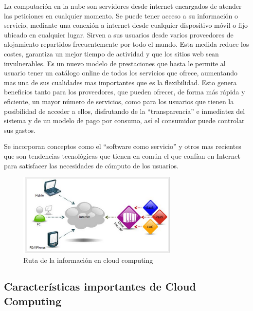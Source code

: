 \documentclass[12pt,a4paper]{article}
\begin{document}
La computación en la nube son servidores desde internet
encargados de atender las peticiones en cualquier momento. Se
puede tener acceso a su información o servicio, mediante una
conexión a internet desde cualquier dispositivo móvil o fijo
ubicado en cualquier lugar. Sirven a sus usuarios desde varios
proveedores de alojamiento repartidos frecuentemente por todo el
mundo. Esta medida reduce los costes, garantiza un mejor tiempo
de actividad y que los sitios web sean invulnerables. Es un nuevo
modelo de prestaciones que hasta le permite al usuario tener un
catálogo online de todos los servicios que ofrece, aumentando
mas una de sus cualidades mas importantes que es la
flexibilidad. Esto genera beneficios tanto para los proveedores,
que pueden ofrecer, de forma más rápida y eficiente, un mayor
número de servicios, como para los usuarios que tienen la
posibilidad de acceder a ellos, disfrutando de la
``transparencia'' e inmediatez del sistema y de un modelo de pago
por consumo, así el consumidor puede controlar sus gastos.\par 
Se incorporan conceptos como  el ``software como servicio'' y otros
mas recientes que son tendencias tecnológicas que tienen en
común el que confían en Internet para satisfacer las necesidades
de cómputo de los usuarios.


\begin{figure}[h!]
 \centering
 \includegraphics[width=0.71\textwidth]{cc_def.png}
\caption[Ruta de datos]{Ruta de la información en cloud
computing}
\end{figure}

\par
\subsection{Características importantes de Cloud Computing}
\end{document}
